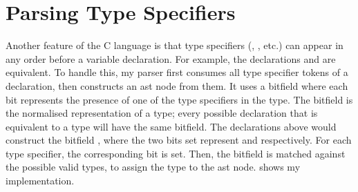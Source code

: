 \documentclass[../00-main.tex]{subfiles}
\begin{document}
\section{Parsing Type Specifiers}\label{app:sec:parsing type specifiers}

Another feature of the C language is that type specifiers (, , etc.) can appear in any order before a variable declaration.
For example, the declarations  and  are equivalent.
To handle this, my parser first consumes all type specifier tokens of a declaration, then constructs an  \gls{ast} node from them.
It uses a bitfield where each bit represents the presence of one of the type specifiers in the type.
The bitfield is the normalised representation of a type; every possible declaration that is equivalent to a type will have the same bitfield.
The declarations above would construct the bitfield , where the two bits set represent  and  respectively.
For each type specifier, the corresponding bit is set.
Then, the bitfield is matched against the possible valid types, to assign the type to the \gls{ast} node.
 shows my implementation.
\end{document}
